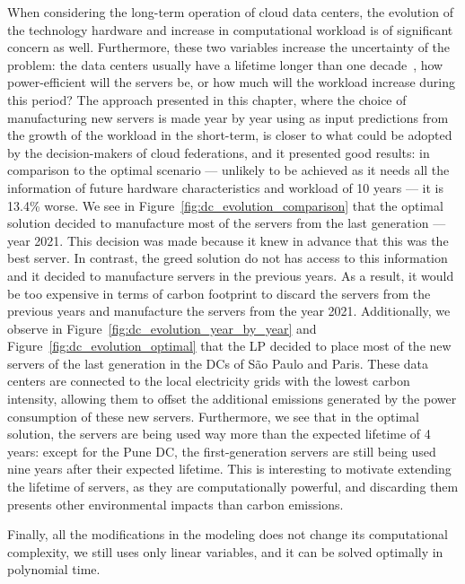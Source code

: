 When considering the long-term operation of cloud data centers, the evolution of the technology hardware and increase in computational workload is of significant concern as well. Furthermore, these two variables increase the uncertainty of the problem: the data centers usually have a lifetime longer than one decade~\cite{datacenter_as_computer}, how power-efficient will the servers be, or how much will the workload increase during this period? The approach presented in this chapter, where the choice of manufacturing new servers is made year by year using as input predictions from the growth of the workload in the short-term, is closer to what could be adopted by the decision-makers of cloud federations, and it presented good results: in comparison to the optimal scenario --- unlikely to be achieved as it needs all the information of future hardware characteristics and workload of 10 years --- it is 13.4\% worse. We see in Figure~\ref{fig:dc_evolution_comparison} that the optimal solution decided to manufacture most of the servers from the last generation --- year 2021. This decision was made because it knew in advance that this was the best server. In contrast, the greed solution do not has access to this information and it decided to manufacture servers in the previous years. As a result, it would be too expensive in terms of carbon footprint to discard the servers from the previous years and manufacture the servers from the year 2021. Additionally, we observe in Figure~\ref{fig:dc_evolution_year_by_year} and Figure~\ref{fig:dc_evolution_optimal} that the LP decided to place most of the new servers of the last generation in the DCs of São Paulo and Paris. These data centers are connected to the local electricity grids with the lowest carbon intensity, allowing them to offset the additional emissions generated by the power consumption of these new servers. Furthermore, we see that in the optimal solution, the servers are being used way more than the expected lifetime of 4 years: except for the Pune DC, the first-generation servers are still being used nine years after their expected lifetime. This is interesting to motivate extending the lifetime of servers, as they are computationally powerful, and discarding them presents other environmental impacts than carbon emissions. 

Finally, all the modifications in the modeling does not change its computational complexity, we still uses only linear variables, and it can be solved optimally in polynomial time.

